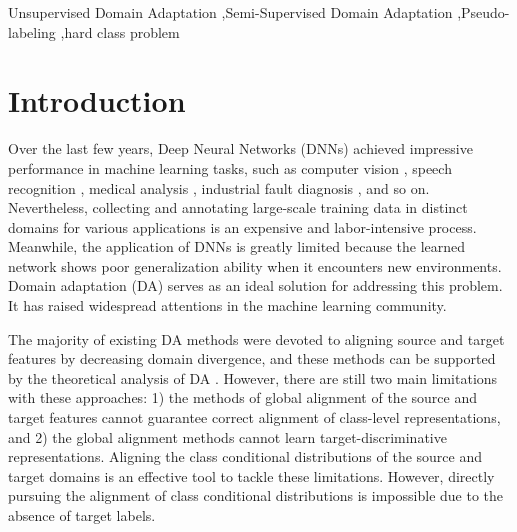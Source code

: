 \documentclass[a4paper,fleqn]{cas-dc}
\begin{document}
	\begin{keywords}
		Unsupervised Domain Adaptation \sep Semi-Supervised Domain Adaptation \sep Pseudo-labeling \sep hard class problem
	\end{keywords}
	
	
	\maketitle
	
	\section{Introduction}
	
	\label{sec1}
	
	Over the last few years, Deep Neural Networks (DNNs) \cite{lecun2015deep} achieved impressive performance in machine learning tasks, such as computer vision \cite{he2016deep}, speech recognition \cite{Amodei2015Deep}, medical analysis \cite{Zhang2020CollaborativeUD}, {industrial fault diagnosis \cite{Li2019WaveletKernelNetAI,Li2020MultireceptiveFG},} and so on. Nevertheless, collecting and annotating large-scale training data in distinct domains for various applications is an expensive and labor-intensive process. Meanwhile, the application of DNNs is greatly limited because the learned network shows poor generalization ability when it encounters new environments. Domain adaptation (DA) \cite{pan2009survey} serves as an ideal solution for addressing this problem. It has raised widespread attentions \cite{DBLP:journals/ml/Ben-DavidBCKPV10,ganin2016domain} in the machine learning community.
	
	
	
	
	The majority of existing DA methods \cite{gretton2012kernel,long2015learning,ganin2014unsupervised,ganin2016domain,SunS16Deep,SanjayVariational,tzeng2014deep,sun2016return,shao2018feature} were devoted to aligning source and target features by decreasing domain divergence, and these methods can be supported by the theoretical analysis of DA  \cite{DBLP:journals/ml/Ben-DavidBCKPV10}. However, there are still two main limitations with these approaches: 1) the methods of global alignment of the source and target features cannot guarantee correct alignment of class-level representations, and 2) the global alignment methods cannot learn target-discriminative representations. Aligning the class conditional distributions of the source and target domains is an effective tool to tackle these limitations. However, directly pursuing the alignment of class conditional distributions is impossible due to the absence of target labels.
	
\end{document}
